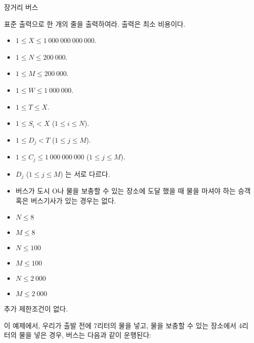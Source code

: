 \begin{problem}{장거리 버스}
	
	\OutputFile
	
	표준 출력으로 한 개의 줄을 출력하여라. 출력은 최소 비용이다.
	
	\Constraints
	
	\begin{itemize}
	
	\item $1 \le X \le 1\ 000\ 000\ 000\ 000$.
	\item $1 \le N \le 200\ 000$.
	\item $1 \le M \le 200\ 000$.
	\item $1 \le W \le 1\ 000\ 000$.
	\item $1 \le T \le X$.
	\item $1 \le S_i < X$ ($1 \le i \le N$).
	\item $1 \le D_j < T$ ($1 \le j \le M$).
	\item $1 \le C_j \le 1\ 000\ 000\ 000$ ($1 \le j \le M$).
	\item $D_j$ ($1 \le j \le M$) 는 서로 다르다.
	\item 버스가 도시 O나 물을 보충할 수 있는 장소에 도달 했을 때 물을 마셔야 하는 승객 혹은 버스기사가 있는 경우는 없다.
	\end{itemize}
	
	
	\begin{itemize}
		\item $N \le 8$
		\item $M \le 8$
	\end{itemize}


	\begin{itemize}
		\item $N \le 100$
		\item $M \le 100$
	\end{itemize}

	\begin{itemize}
		\item $N \le 2\ 000$
		\item $M \le 2\ 000$
	\end{itemize}

	
	추가 제한조건이 없다.
	
	\Examples
		
	\begin{example}
	\end{example}
	
	이 예제에서, 우리가 출발 전에 7리터의 물을 넣고, 물을 보충할 수 있는 장소에서 4리터의 물을 넣은 경우, 버스는 다음과 같이 운행된다:
	

\end{problem}

